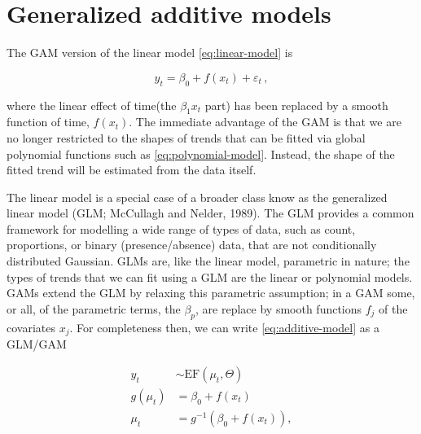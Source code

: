 \documentclass[12pt,]{article}
\begin{document}
\section{Generalized additive models}\label{generalized-additive-models}

The GAM version of the linear model \eqref{eq:linear-model} is

\begin{equation} \label{eq:additive-model}
y_t = \beta_0 + f(x_t) + \varepsilon_t \, ,
\end{equation}

where the linear effect of time(the \(\beta_1 x_t\) part) has been
replaced by a smooth function of time, \(f(x_t)\). The immediate
advantage of the GAM is that we are no longer restricted to the shapes
of trends that can be fitted via global polynomial functions such as
\eqref{eq:polynomial-model}. Instead, the shape of the fitted trend will
be estimated from the data itself.

The linear model is a special case of a broader class know as the
generalized linear model (GLM; McCullagh and Nelder, 1989). The GLM
provides a common framework for modelling a wide range of types of data,
such as count, proportions, or binary (presence/absence) data, that are
not conditionally distributed Gaussian. GLMs are, like the linear model,
parametric in nature; the types of trends that we can fit using a GLM
are the linear or polynomial models. GAMs extend the GLM by relaxing
this parametric assumption; in a GAM some, or all, of the parametric
terms, the \(\beta_p\), are replace by smooth functions \(f_j\) of the
covariates \(x_j\). For completeness then, we can write
\eqref{eq:additive-model} as a GLM/GAM

\begin{subequations}
\label{eq:gam}
\begin{align}
y_t &\sim \text{EF}(\mu_t, \Theta) \label{eq:gam-ef} \\
g(\mu_t) &= \beta_0 + f(x_t) \label{eq:gam-linear-pred} \\
\mu_t    &= g^{-1}(\beta_0 + f(x_t)), \label{eq:gam-inverse} 
\end{align}
\end{subequations}
\end{document}
